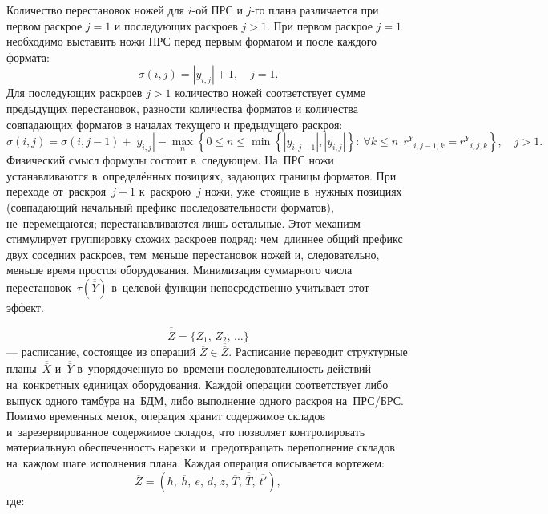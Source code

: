 Количество перестановок ножей для $i$-ой ПРС и $j$-го плана различается при первом раскрое $j = 1$ и последующих раскроев $j > 1$.
При первом раскрое $j = 1$ необходимо выставить ножи ПРС перед первым форматом и после каждого формата:
\[
\sigma(i,j) = \left| y_{i,j} \right| + 1, \quad j = 1.
\]
Для последующих раскроев $j > 1$ количество ножей соответствует сумме предыдущих перестановок, разности количества форматов и количества совпадающих форматов в началах текущего и предыдущего раскроя:
\[
\sigma(i,j) = \sigma(i,j - 1) + \left| y_{i,j} \right| - \max_{n}\left\{ 0 \leq n \leq \min\left\{ \left| y_{i,j - 1} \right|,\left| y_{i,j} \right| \right\}:\ \forall k \leq n\ \ {r^Y}_{i,j - 1,k} = {r^Y}_{i,j,k} \right\},\quad j > 1.
\]
Физический смысл формулы состоит в~следующем.
На~ПРС ножи устанавливаются в~определённых позициях, задающих границы форматов.
При переходе от~раскроя~$j{-}1$ к~раскрою~$j$ ножи, уже~стоящие в~нужных позициях (совпадающий начальный префикс последовательности форматов), не~перемещаются; перестанавливаются лишь остальные.
Этот механизм стимулирует группировку схожих раскроев подряд: чем~длиннее общий префикс двух соседних раскроев, тем~меньше перестановок ножей и, следовательно, меньше время простоя оборудования.
Минимизация суммарного числа перестановок~$\tau(\overline{\overline{Y}})$ в~целевой функции непосредственно учитывает этот эффект.

\[
\overline{\overline{Z}}  = \{\overline{Z}_1,\,\overline{Z}_2,\,\ldots\}
\]
--- расписание, состоящее из операций $\overline{Z} \in \overline{\overline{Z}}$.
Расписание переводит структурные планы~$\overline{\overline{X}}$ и~$\overline{\overline{Y}}$ в~упорядоченную во~времени последовательность действий на~конкретных единицах оборудования.
Каждой операции соответствует либо выпуск одного тамбура на~БДМ, либо выполнение одного раскроя на~ПРС/БРС.
Помимо временных меток, операция хранит содержимое складов и~зарезервированное содержимое складов, что позволяет контролировать материальную обеспеченность нарезки и~предотвращать переполнение складов на~каждом шаге исполнения плана.
Каждая операция описывается кортежем:
\[
\overline{Z} = (h,\ \overline{h},\ e,\,d,\,z,\,\overline{T},\,\overline{\overline{T}},\ \overline{t'}),
\]
где:

